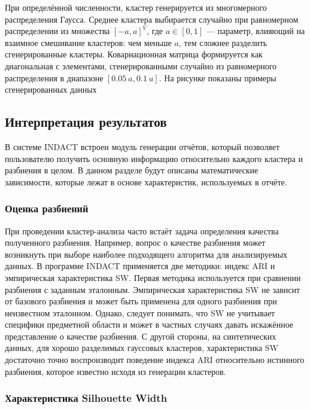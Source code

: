 \documentclass[12pt]{diploma}
\begin{document}
	При определённой численности, кластер генерируется из многомерного распределения Гаусса. Среднее кластера выбирается случайно при равномерном распределении из множества $ [-a,a]^V $, где $ a \in [0,1] $ --- параметр, влияющий на взаимное смешивание кластеров: чем меньше $ a $, тем сложнее разделить сгенерированные кластеры. Ковариационная матрица формируется как диагональная с элементами, сгенерированными случайно из равномерного распределения в диапазоне $ [0.05\:a, 0.1\:a] $. 
	На рисунке показаны примеры сгенерированных данных 
	
	
	\subsection{Интерпретация результатов}
	
	В системе INDACT встроен модуль генерации отчётов, который позволяет пользователю получить основную информацию относительно каждого кластера и разбиения в целом. В данном разделе будут описаны математические зависимости, которые лежат в основе характеристик, используемых в отчёте. 
	
		
	\subsubsection{Оценка разбиений}
	
	При проведении кластер-анализа часто встаёт задача определения качества полученного разбиения. Например, вопрос о качестве разбиения может возникнуть при выборе наиболее подходящего алгоритма для анализируемых данных. В программе INDACT применяется две методики: индекс ARI и эмпирическая характеристика SW. Первая методика используется при сравнении разбиения с заданным эталонным. Эмпирическая характеристика SW не зависит от базового разбиения и может быть применена для одного разбиения при неизвестном эталонном. Однако, следует понимать, что SW не учитывает специфики предметной области и может в частных случаях давать искажённое представление о качестве разбиения. С другой стороны, на синтетических данных, для хорошо разделимых гауссовых кластеров, характеристика SW достаточно точно воспроизводит поведение индекса ARI относительно истинного разбиения, которое известно исходя из генерации кластеров.

	\subsubsection{Характеристика Silhouette Width}
\end{document}
